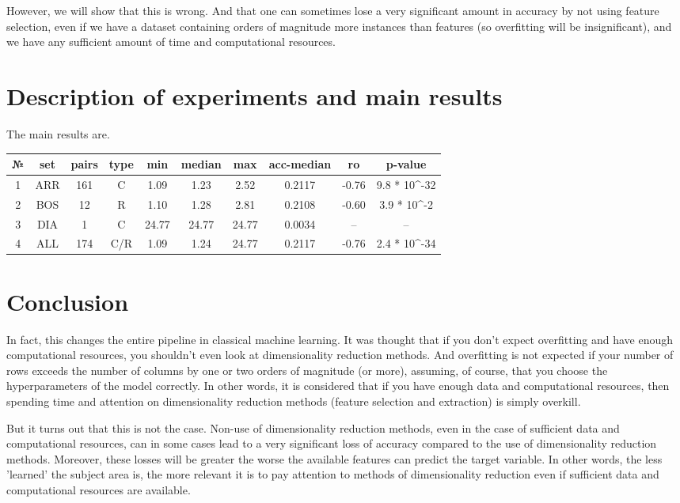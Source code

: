 \documentclass[12pt]{a&t}
\begin{document}
However, we will show that this is wrong. And that one can sometimes lose a very significant amount in accuracy by not using feature selection, even if we have a dataset containing orders of magnitude more instances than features (so overfitting will be insignificant), and we have any sufficient amount of time and computational resources.

\section{Description of experiments and main results}
The main results are.

\begin{center}
\begin{tabular}{ |c||c|c|c|c|c|c|c|c|c| } 
  \hline
  № & set & pairs & type & min & median & max & acc-median & ro & p-value \\
 \hline
 \hline
 1 & ARR & 161 & C & 1.09 & 1.23 & 2.52 & 0.2117 & -0.76 & 9.8 * 10^{-32} \\ 
 2 & BOS & 12 & R & 1.10 & 1.28 & 2.81 & 0.2108 & -0.60 & 3.9 * 10^{-2} \\ 
 3 & DIA & 1 & C& 24.77 & 24.77 & 24.77 & 0.0034 & -- & --\\ 
 4 & ALL & 174 & C/R & 1.09 & 1.24 & 24.77 & 0.2117 & -0.76 & 2.4 * 10^{-34} \\ 
 \hline
\end{tabular}
\end{center}

\section{Conclusion}
In fact, this changes the entire pipeline in classical machine learning. It was thought that if you don't expect overfitting and have enough computational resources, you shouldn't even look at dimensionality reduction methods. And overfitting is not expected if your number of rows exceeds the number of columns by one or two orders of magnitude (or more), assuming, of course, that you choose the hyperparameters of the model correctly. In other words, it is considered that if you have enough data and computational resources, then spending time and attention on dimensionality reduction methods (feature selection and extraction) is simply overkill. 

But it turns out that this is not the case. Non-use of dimensionality reduction methods, even in the case of sufficient data and computational resources, can in some cases lead to a very significant loss of accuracy compared to the use of dimensionality reduction methods. Moreover, these losses will be greater the worse the available features can predict the target variable. In other words, the less 'learned' the subject area is, the more relevant it is to pay attention to methods of dimensionality reduction even if sufficient data and computational resources are available.
\end{document}
